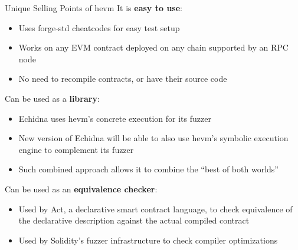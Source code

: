 \documentclass[aspectratio=169]{beamer}
\begin{document}
\begin{frame}{Unique Selling Points of hevm}
It is \textbf{easy to use}:
\begin{itemize}
    \item Uses forge-std cheatcodes for easy test setup
    \item Works on any EVM contract deployed on any chain supported by an RPC node
    \item No need to recompile contracts, or have their source code
\end{itemize}
\smallskip

Can be used as a \textbf{library}:
\begin{itemize}
    \item Echidna uses hevm's concrete execution for its fuzzer
    \item New version of Echidna will be able to also use
        hevm's symbolic execution engine to complement its fuzzer
    \item Such combined approach allows it to combine the
        ``best of both worlds''
\end{itemize}
\smallskip

Can be used as an \textbf{equivalence checker}:
\begin{itemize}
    \item Used by Act, a declarative smart contract language, to check
        equivalence of the declarative description
        against the actual compiled contract
    \item Used by Solidity's fuzzer infrastructure to check compiler
        optimizations
\end{itemize}
\end{frame}
\end{document}
